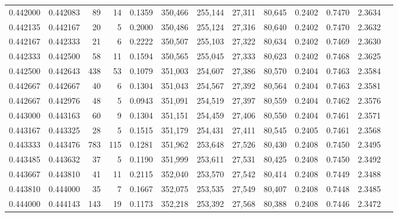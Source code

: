 \begin{tabular}{rrrrrrrrrrrrr}
0.442000 & 0.442083 &    89 &  14 &                                     0.1359 & 350,466 & 255,144 &  27,311 &  80,645 & 0.2402 & 0.7470 & 2.3634 \\
0.442135 & 0.442167 &    20 &   5 &                                     0.2000 & 350,486 & 255,124 &  27,316 &  80,640 & 0.2402 & 0.7470 & 2.3632 \\
0.442167 & 0.442333 &    21 &   6 &                                     0.2222 & 350,507 & 255,103 &  27,322 &  80,634 & 0.2402 & 0.7469 & 2.3630 \\
0.442333 & 0.442500 &    58 &  11 &                                     0.1594 & 350,565 & 255,045 &  27,333 &  80,623 & 0.2402 & 0.7468 & 2.3625 \\
0.442500 & 0.442643 &   438 &  53 &                                     0.1079 & 351,003 & 254,607 &  27,386 &  80,570 & 0.2404 & 0.7463 & 2.3584 \\
0.442667 & 0.442667 &    40 &   6 &                                     0.1304 & 351,043 & 254,567 &  27,392 &  80,564 & 0.2404 & 0.7463 & 2.3581 \\
0.442667 & 0.442976 &    48 &   5 &                                     0.0943 & 351,091 & 254,519 &  27,397 &  80,559 & 0.2404 & 0.7462 & 2.3576 \\
0.443000 & 0.443163 &    60 &   9 &                                     0.1304 & 351,151 & 254,459 &  27,406 &  80,550 & 0.2404 & 0.7461 & 2.3571 \\
0.443167 & 0.443325 &    28 &   5 &                                     0.1515 & 351,179 & 254,431 &  27,411 &  80,545 & 0.2405 & 0.7461 & 2.3568 \\
0.443333 & 0.443476 &   783 & 115 &                                     0.1281 & 351,962 & 253,648 &  27,526 &  80,430 & 0.2408 & 0.7450 & 2.3495 \\
0.443485 & 0.443632 &    37 &   5 &                                     0.1190 & 351,999 & 253,611 &  27,531 &  80,425 & 0.2408 & 0.7450 & 2.3492 \\
0.443667 & 0.443810 &    41 &  11 &                                     0.2115 & 352,040 & 253,570 &  27,542 &  80,414 & 0.2408 & 0.7449 & 2.3488 \\
0.443810 & 0.444000 &    35 &   7 &                                     0.1667 & 352,075 & 253,535 &  27,549 &  80,407 & 0.2408 & 0.7448 & 2.3485 \\
0.444000 & 0.444143 &   143 &  19 &                                     0.1173 & 352,218 & 253,392 &  27,568 &  80,388 & 0.2408 & 0.7446 & 2.3472 \\

\end{tabular}

